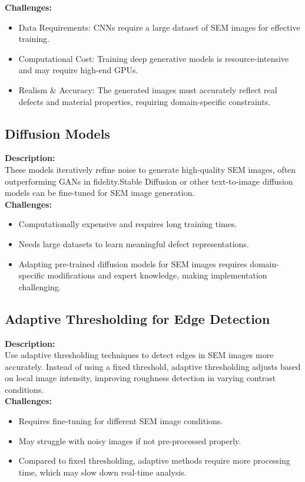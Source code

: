 \documentclass[12pt,oneside,letterpaper,english]{article}
\begin{document}
\textbf{Challenges:}
\begin{itemize}
	\item Data Requirements: CNNs require a large dataset of SEM images for effective training.
	\item Computational Cost: Training deep generative models is resource-intensive and may require high-end GPUs.
	\item Realism \& Accuracy: The generated images must accurately reflect real defects and material properties, requiring domain-specific constraints.		
\end{itemize}

\subsection{Diffusion Models}
\textbf{Description:}\\
These models iteratively refine noise to generate high-quality SEM images, often outperforming GANs in fidelity.Stable Diffusion or other text-to-image diffusion models can be fine-tuned for SEM image generation.\\

\textbf{Challenges:}
\begin{itemize}
	\item Computationally expensive and requires long training times.
	\item Needs large datasets to learn meaningful defect representations.
	\item Adapting pre-trained diffusion models for SEM images requires domain-specific modifications and expert knowledge, making implementation challenging.
\end{itemize}

\subsection{ Adaptive Thresholding for Edge Detection}
\textbf{Description:}\\
Use adaptive thresholding techniques to detect edges in SEM images more accurately. Instead of using a fixed threshold, adaptive thresholding adjusts based on local image intensity, improving roughness detection in varying contrast conditions.\\

\textbf{Challenges:}
\begin{itemize}
	\item Requires fine-tuning for different SEM image conditions.
	\item May struggle with noisy images if not pre-processed properly.	
	\item Compared to fixed thresholding, adaptive methods require more processing time, which may slow down real-time analysis.
\end{itemize}
\end{document}
